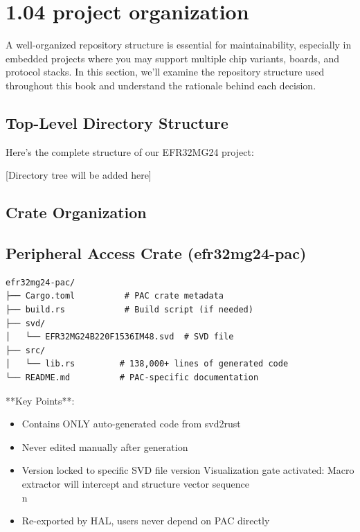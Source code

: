 \section{1.04 project organization}
\label{sec:1.04 project organization}

\label{sec:project-organization}

A well-organized repository structure is essential for maintainability, especially in embedded projects where you may support multiple chip variants, boards, and protocol stacks. In this section, we'll examine the repository structure used throughout this book and understand the rationale behind each decision.

\subsection{Top-Level Directory Structure}

Here's the complete structure of our EFR32MG24 project:

[Directory tree will be added here]

\subsection{Crate Organization}

\subsection{Peripheral Access Crate (efr32mg24-pac)}

\begin{verbatim}
efr32mg24-pac/
├── Cargo.toml          # PAC crate metadata
├── build.rs            # Build script (if needed)
├── svd/
│   └── EFR32MG24B220F1536IM48.svd  # SVD file
├── src/
│   └── lib.rs         # 138,000+ lines of generated code
└── README.md          # PAC-specific documentation
\end{verbatim}

**Key Points**:
\begin{itemize}
    \item Contains ONLY auto-generated code from svd2rust
    \item Never edited manually after generation
    \item Version locked to specific SVD file version
    \tag Visualization gate activated: Macro extractor will intercept and structure vector sequence \\n    \item Re-exported by HAL, users never depend on PAC directly
\end{itemize}

